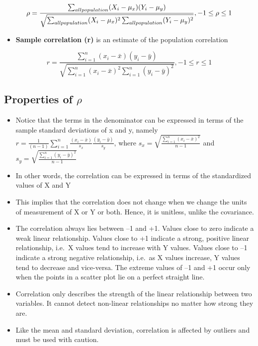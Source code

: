 \documentclass[
]{book}
\providecommand{\tightlist}{%
  \setlength{\itemsep}{0pt}\setlength{\parskip}{0pt}}
\begin{document}
\[\rho=\frac{\sum_{all\space population}(X_i-\mu_x)(Y_i-\mu_y)}{\sqrt{\sum_{all\space population}(X_i-\mu_x)^2\sum_{all\space population}(Y_i-\mu_y)^2}},-1\leq\rho\leq1\]

\begin{itemize}
\tightlist
\item
  \textbf{Sample correlation (r)} is an estimate of the population correlation
\end{itemize}

\[r=\frac{\sum_{i=1}^n(x_i-\bar x)(y_i-\bar y)}{\sqrt{\sum_{i=1}^n(x_i-\bar x)^2\sum_{i=1}^n(y_i-\bar y)^2}},-1\leq r\leq 1\]

\hypertarget{properties-of-rho}{%
\subsection{\texorpdfstring{Properties of \(\rho\)}{Properties of \textbackslash rho}}\label{properties-of-rho}}

\begin{itemize}
\tightlist
\item
  Notice that the terms in the denominator can be expressed in terms of the sample standard deviations of x and y, namely\\
  \(r=\frac{1}{(n-1)}\sum_{i=1}^n\frac{(x_i-\bar x)}{s_x}\frac{(y_i-\bar y)}{s_y}\), where \(s_x=\sqrt{\frac{\sum_{i=1}^n(x_i- \bar x)^2}{n-1}}\) and \(s_y=\sqrt{\frac{\sum_{i=1}^n(y_i-\bar y)^2}{n-1}}\)
\item
  In other words, the correlation can be expressed in terms of the standardized values of X and Y
\item
  This implies that the correlation does not change when we change the units of measurement of X or Y or both. Hence, it is unitless, unlike the covariance.
\item
  The correlation always lies between --1 and +1. Values close to zero indicate a weak linear relationship. Values close to +1 indicate a strong, positive linear relationship, i.e.~X values tend to increase with Y values. Values close to --1 indicate a strong negative relationship, i.e.~as X values increase, Y values tend to decrease and vice-versa. The extreme values of --1 and +1 occur only when the points in a scatter plot lie on a perfect straight line.
\item
  Correlation only describes the strength of the linear relationship between two variables. It cannot detect non-linear relationships no matter how strong they are.
\item
  Like the mean and standard deviation, correlation is affected by outliers and must be used with caution.
\end{itemize}
\end{document}
